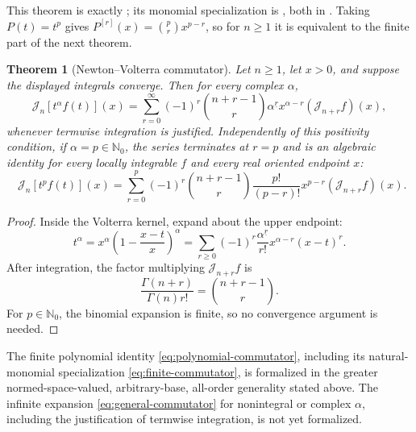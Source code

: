 \documentclass[11pt,oneside]{article}
\newtheorem{theorem}{Theorem}[section]
\theoremstyle{definition}
\theoremstyle{remark}
\newcommand{\N}{\mathbb N}
\newcommand{\fall}[2]{#1^{\underline{#2}}}
\newcommand{\Jn}{\mathcal J}
\newcommand{\1}{\mathbf 1}
\begin{document}
This theorem is exactly
; its monomial specialization is
, both in
.  Taking \(P(t)=t^p\) gives
\(P^{[r]}(x)=\binom prx^{p-r}\), so for \(n\geq1\) it is equivalent to the
finite part of the next theorem.

\begin{theorem}[Newton--Volterra commutator]\label{thm:commutator}
Let \(n\geq1\), let \(x>0\), and suppose the displayed integrals converge.
Then for every complex \(\alpha\),
\begin{equation}
 \Jn_n[t^\alpha f(t)](x)
 =\sum_{r=0}^{\infty}(-1)^r\binom{n+r-1}{r}\fall{\alpha}{r}
 x^{\alpha-r}(\Jn_{n+r}f)(x),                                 \label{eq:general-commutator}
\end{equation}
whenever termwise integration is justified.  Independently of this
positivity condition, if \(\alpha=p\in\N_0\), the series terminates at
\(r=p\) and is an algebraic identity for every locally integrable \(f\) and
every real oriented endpoint \(x\):
\begin{equation}
 \boxed{\quad
 \Jn_n[t^pf(t)](x)
 =\sum_{r=0}^{p}(-1)^r\binom{n+r-1}{r}\frac{p!}{(p-r)!}
 x^{p-r}(\Jn_{n+r}f)(x).
 \quad}                                                        \label{eq:finite-commutator}
\end{equation}
\end{theorem}

\begin{proof}
Inside the Volterra kernel, expand about the upper endpoint:
\[
 t^\alpha=x^\alpha\left(1-\frac{x-t}{x}\right)^\alpha
 =\sum_{r\geq0}(-1)^r\frac{\fall{\alpha}{r}}{r!}
 x^{\alpha-r}(x-t)^r.
\]
After integration, the factor multiplying \(\Jn_{n+r}f\) is
\[
 \frac{\Gamma(n+r)}{\Gamma(n)r!}
 =\binom{n+r-1}{r}.
\]
For \(p\in\N_0\), the binomial expansion is finite, so no convergence
argument is needed.
\end{proof}

\begin{statusbox}
The finite polynomial identity \eqref{eq:polynomial-commutator}, including its
natural-monomial specialization \eqref{eq:finite-commutator}, is formalized in
the greater normed-space-valued, arbitrary-base, all-order generality stated
above.
The infinite expansion \eqref{eq:general-commutator} for nonintegral or complex
\(\alpha\), including the justification of termwise integration, is not yet
formalized.
\end{statusbox}
\end{document}
